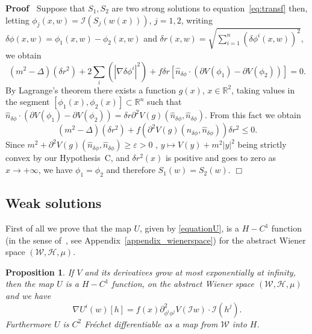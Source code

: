 \documentclass[a4paper,10pt]{article}
\newenvironment{proof}{\noindent\textbf{Proof\ }}{\hspace*{\fill}$\Box$\medskip}
\newtheorem{proposition}[theorem]{Proposition}
{\theorembodyfont{\rmfamily}\newtheorem{remark}[theorem]{Remark}}
\begin{document}
\begin{proof}
  Suppose that $S_1, S_2$ are two strong solutions to
  equation~{\eqref{eq:transf}} then, letting $\phi_j (x, w) =\mathcal{I} (S_j
  (w (x)))$, $j = 1, 2$, writing $\delta \phi (x, w) = \phi_1 (x, w) - \phi_2
  (x, w)$ and $\delta r (x, w) = \sqrt{\sum_{i = 1}^n (\delta \phi^i (x,
  w))^2}$, we obtain
  \[ (m^2 - \Delta) (\delta r^2) + 2 \sum_i (| \nabla \delta \phi^i |^2) + f
     \delta r [\hat{n}_{\delta \phi} \cdot (\partial V (\phi_1) - \partial V
     (\phi_2))] = 0. \]
  By Lagrange's theorem there exists a function $g (x)$, $x \in \mathbb{R}^2$,
  taking values in the segment $[\phi_1 (x), \phi_2 (x)] \subset \mathbb{R}^n$
  such that $\hat{n}_{\delta \phi} \cdot (\partial V (\phi_1) - \partial V
  (\phi_2)) = \delta r \partial^2 V (g) (\hat{n}_{\delta \phi},
  \hat{n}_{\delta \phi})$. From this fact we obtain
  \[ (m^2 - \Delta) (\delta r^2) + f (\partial^2 V (g) (\hat{n}_{\delta \phi},
     \hat{n}_{\delta \phi})) \delta r^2 \leqslant 0. \]
  Since $m^2 + \partial^2 V (g) (\hat{n}_{\delta \phi}, \hat{n}_{\delta \phi})
  \geqslant \varepsilon > 0$ , $y \mapsto V (y) + m^2 | y |^2$ being strictly
  convex by our Hypothesis~C, and $\delta r^2 (x)$ is positive and goes to
  zero as $x \rightarrow + \infty$, we have $\phi_1 = \phi_2$ and therefore
  $S_1 (w) = S_2 (w)$.
\end{proof}

\subsection{Weak solutions}

First of all we prove that the map $U$, given by {\eqref{equationU}}, is a $H
- C^1$ function (in the sense of~{\cite{Ustunel2000}}, see
Appendix~\ref{appendix_wienerspace}) for the abstract Wiener space
$(\mathcal{W}, \mathcal{H}, \mu)$.

\begin{proposition}
  \label{proposition_C1H}If $V$ and its derivatives grow at most exponentially
  at infinity, then the map $U$ is a $H - C^1$ function, on the abstract
  Wiener space $(\mathcal{W}, \mathcal{H}, \mu)$ and we have
  \[ \nabla U^i (w) [h] = f (x) \partial_{\phi^i \phi^j}^2 V (\mathcal{I}w)
     \cdot \mathcal{I} (h^j) . \]
  Furthermore $U$ is $C^2$ Fr{\'e}chet differentiable as a map from
  $\mathcal{W}$ into $H$.
\end{proposition}
\end{document}
